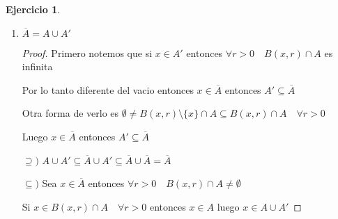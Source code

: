 \documentclass[12pt]{report}
\newcommand{\ol}{\overline}
\theoremstyle{definition}
\newtheorem{ej}{Ejercicio}
\begin{document}
\begin{ej}
\begin{enumerate}
\begin{enumerate}
\begin{proof}
	    Sin usar sucesiones:

	    $\subseteq$) Sea $x \in (A \cup B) '$. Entonces: 

	    $$\emptyset \neq (B(x,r)\setminus\{x\}) \cap (A \cup B) = ((B(x,r)\setminus \{x\}) \cap A) \cup ((B(x,r)\setminus\{x\}) \cap B)$$

	    Entonces para cada radio $r$ sucede $B(x,r)\setminus\{x\} \cap A \neq \emptyset$ o $B(x,r)\setminus\{x\} \cap B \neq \emptyset $
 
            Supongamos que $x \notin A'\cup B'$ entonces $x \notin A'$ y $x \notin B'$ 

	    Luego $\exists r_1>0$ tal que $(B(x,r_1)\setminus\{x\}) \cap A = \emptyset$ 

	    También $\exists r_2>0$ tal que $(B(x,r_2) \setminus\{x\} )\cap B = \emptyset$

	    Tomamos $r = min \{r_1,r_2\}$ 

	    Entonces $(B(x,r)\setminus \{x\} \cap A = \emptyset)$ y también $ (B(x,r)\setminus \{x\} \cap B = \emptyset)   $

	    Lo que es absurdo, por lo tanto $x \in A'\cup B'$

	  $\supseteq )$ Sea $x \in A'\cup B'$ entonces spd $x \in A'$ por lo tanto $B(x,r)\setminus\{x\} \cap A \neq \emptyset \quad \forall r>0$

	  Pero entonces $B(x,r)\setminus\{x\}\cap (A \cup B) \neq \emptyset\quad \forall r>0$ por lo tanto $x \in (A\cup B)'$
	  \end{proof}
	\item $\ol A = A \cup A'$
	  \begin{proof}
	  Primero notemos que si $x \in A'$ entonces $\forall r > 0 \quad  B(x,r) \cap A$ es infinita 

	 Por lo tanto diferente del vacio entonces $x \in \ol A$ entonces $A' \subseteq \ol A$

	 Otra forma de verlo es $\emptyset \neq B(x,r)\setminus\{x\} \cap A \subseteq B(x,r) \cap A \quad \forall r>0$

	 Luego $x \in \ol A$ entonces $A'\subseteq \ol A$

	  $\supseteq )$ $ A \cup A' \subseteq \ol A \cup A' \subseteq \ol A \cup \ol A= \ol A$

	$\subseteq )$ Sea $x \in \ol A$ entonces $\forall r>0 \quad  B(x,r) \cap A \neq \emptyset$

	Si $x \in B(x,r) \cap A \quad \forall r >0$ entonces $x \in A$ luego $x \in A\cup A'$


\end{proof}
\end{enumerate}
\end{enumerate}
\end{ej}
\end{document}

